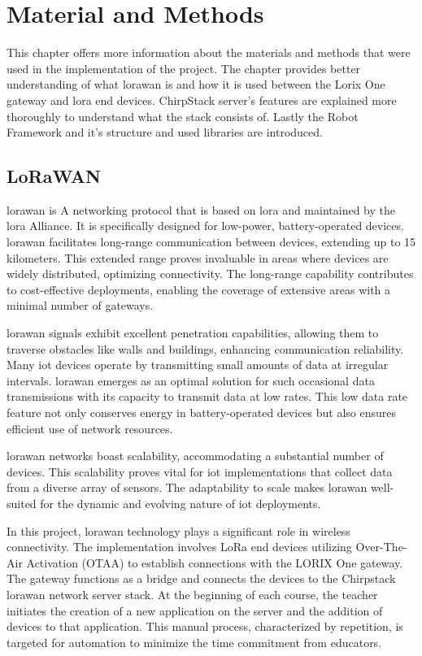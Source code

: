 
\chapter{Material and Methods} \label{ch:mat_met}

This chapter offers more information about the materials and methods that were used in the implementation of the project.
The chapter provides better understanding of what \gls{lorawan} is and how it is used between the Lorix One gateway and \gls{lora} end devices.
ChirpStack server's features are explained more thoroughly to understand what the stack consists of. 
Lastly the Robot Framework and it's structure and used libraries are introduced.

\section{LoRaWAN}
\gls{lorawan} is A networking protocol that is based on \gls{lora} and maintained by the \gls{lora} Alliance\cite{lora_alliance:about_lorawan}.
It is specifically designed for low-power, battery-operated devices.
\gls{lorawan} facilitates long-range communication between devices, extending up to 15 kilometers.
This extended range proves invaluable in areas where devices are widely distributed, optimizing connectivity.
The long-range capability contributes to cost-effective deployments, enabling the coverage of extensive areas with a minimal number of gateways.

\gls{lorawan} signals exhibit excellent penetration capabilities, allowing them to traverse obstacles like walls and buildings, enhancing communication reliability.
Many \gls{iot} devices operate by transmitting small amounts of data at irregular intervals.
\gls{lorawan} emerges as an optimal solution for such occasional data transmissions with its capacity to transmit data at low rates.
This low data rate feature not only conserves energy in battery-operated devices but also ensures efficient use of network resources.

\gls{lorawan} networks boast scalability, accommodating a substantial number of devices.
This scalability proves vital for \gls{iot} implementations that collect data from a diverse array of sensors.
The adaptability to scale makes \gls{lorawan} well-suited for the dynamic and evolving nature of \gls{iot} deployments.

In this project, \gls{lorawan} technology plays a significant role in wireless connectivity.
The implementation involves LoRa end devices utilizing Over-The-Air Activation (OTAA) to establish connections with the LORIX One gateway.
The gateway functions as a bridge and connects the devices to the Chirpstack \gls{lorawan} network server stack.
At the beginning of each course, the teacher initiates the creation of a new application on the server and the addition of devices to that application.
This manual process, characterized by repetition, is targeted for automation to minimize the time commitment from educators.

